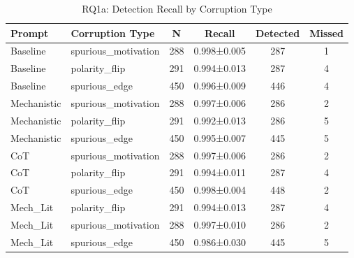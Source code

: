\begin{table}[htbp]
\centering
\caption{RQ1a: Detection Recall by Corruption Type}
\label{tab:rq1a_corruption_type}
\begin{tabular}{llcccc}
\toprule
\textbf{Prompt} & \textbf{Corruption Type} & \textbf{N} & \textbf{Recall} & \textbf{Detected} & \textbf{Missed} \\
\midrule
Baseline & spurious_motivation & 288 & 0.998±0.005 & 287 & 1 \\
Baseline & polarity_flip & 291 & 0.994±0.013 & 287 & 4 \\
Baseline & spurious_edge & 450 & 0.996±0.009 & 446 & 4 \\
Mechanistic & spurious_motivation & 288 & 0.997±0.006 & 286 & 2 \\
Mechanistic & polarity_flip & 291 & 0.992±0.013 & 286 & 5 \\
Mechanistic & spurious_edge & 450 & 0.995±0.007 & 445 & 5 \\
CoT & spurious_motivation & 288 & 0.997±0.006 & 286 & 2 \\
CoT & polarity_flip & 291 & 0.994±0.011 & 287 & 4 \\
CoT & spurious_edge & 450 & 0.998±0.004 & 448 & 2 \\
Mech_Lit & polarity_flip & 291 & 0.994±0.013 & 287 & 4 \\
Mech_Lit & spurious_motivation & 288 & 0.997±0.010 & 286 & 2 \\
Mech_Lit & spurious_edge & 450 & 0.986±0.030 & 445 & 5 \\
\bottomrule
\end{tabular}
\end{table}
